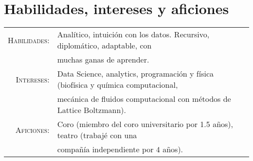 \documentclass[a4paper,10pt]{article} %
\begin{document}
\color{OrangeRed} 
\section{Habilidades, intereses y aficiones}
\color{black}

\begin{tabular}{rl}	

\textsc{Habilidades:} & Analítico, intuición con los datos. Recursivo, diplomático, adaptable, con \\& muchas ganas de aprender.\\
\textsc{Intereses:} & Data Science, analytics, programación y física (biofísica y química computacional,\\&  mecánica de fluidos computacional con métodos de Lattice Boltzmann). \\
\textsc{Aficiones:} & Coro (miembro del coro universitario por 1.5 años), teatro (trabajé con una \\& compañía independiente por 4 años). \\
\end{tabular}
\end{document}
